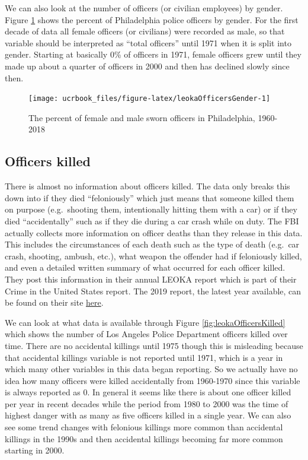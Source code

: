 \documentclass[
  12pt,
  openany]{book}
\begin{document}
We can also look at the number of officers (or civilian employees) by gender. Figure \ref{fig:leokaOfficersGender} shows the percent of Philadelphia police officers by gender. For the first decade of data all female officers (or civilians) were recorded as male, so that variable should be interpreted as ``total officers'' until 1971 when it is split into gender. Starting at basically 0\% of officers in 1971, female officers grew until they made up about a quarter of officers in 2000 and then has declined slowly since then.

\begin{figure}

{\centering \texttt{[image: ucrbook\_files/figure-latex/leokaOfficersGender-1]} 

}

\caption{The percent of female and male sworn officers in Philadelphia, 1960-2018}\label{fig:leokaOfficersGender}
\end{figure}

\hypertarget{officers-killed}{%
\subsection{Officers killed}\label{officers-killed}}

There is almost no information about officers killed. The data only breaks this down into if they died ``feloniously'' which just means that someone killed them on purpose (e.g.~shooting them, intentionally hitting them with a car) or if they died ``accidentally'' such as if they die during a car crash while on duty. The FBI actually collects more information on officer deaths than they release in this data. This includes the circumstances of each death such as the type of death (e.g.~car crash, shooting, ambush, etc.), what weapon the offender had if feloniously killed, and even a detailed written summary of what occurred for each officer killed. They post this information in their annual LEOKA report which is part of their Crime in the United States report. The 2019 report, the latest year available, can be found on their site \href{https://ucr.fbi.gov/leoka/2019/home}{here}.

We can look at what data is available through Figure \ref{fig:leokaOfficersKilled} which shows the number of Los Angeles Police Department officers killed over time. There are no accidental killings until 1975 though this is misleading because that accidental killings variable is not reported until 1971, which is a year in which many other variables in this data began reporting. So we actually have no idea how many officers were killed accidentally from 1960-1970 since this variable is always reported as 0. In general it seems like there is about one officer killed per year in recent decades while the period from 1980 to 2000 was the time of highest danger with as many as five officers killed in a single year. We can also see some trend changes with felonious killings more common than accidental killings in the 1990s and then accidental killings becoming far more common starting in 2000.
\end{document}
